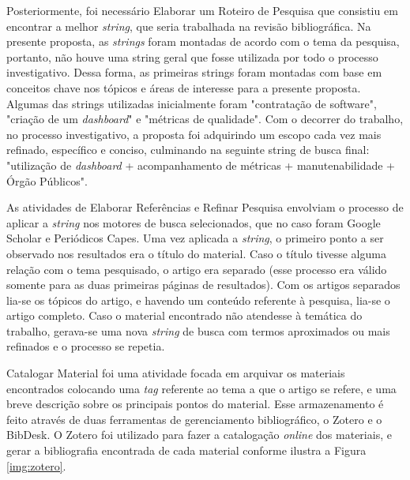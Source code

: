 Posteriormente, foi necessário Elaborar um Roteiro de Pesquisa que consistiu em encontrar a melhor \textit{string}, que seria trabalhada na revisão bibliográfica. Na presente proposta, as \textit{strings} foram montadas de acordo com o tema da pesquisa, portanto, não houve uma string geral que fosse utilizada por todo o processo investigativo. Dessa forma, as primeiras strings foram montadas com base em conceitos chave nos tópicos e áreas de interesse para a presente proposta. Algumas das strings utilizadas inicialmente foram "contratação de software", "criação de um \textit{dashboard}" e "métricas de qualidade". Com o decorrer do trabalho, no processo investigativo, a proposta foi adquirindo um escopo cada vez mais refinado, específico e conciso, culminando na seguinte string de busca final: "utilização de \textit{dashboard} + acompanhamento de métricas + manutenabilidade + Órgão Públicos". 

As atividades de Elaborar Referências e Refinar Pesquisa envolviam o processo de aplicar a \textit{string} nos motores de busca selecionados, que no caso foram Google Scholar e Periódicos Capes. Uma vez aplicada a \textit{string}, o primeiro ponto a ser observado nos resultados era o título do material. Caso o título tivesse alguma relação com o tema pesquisado, o artigo era separado (esse processo era válido somente para as duas primeiras páginas de resultados). Com os artigos separados lia-se os tópicos do artigo, e havendo um conteúdo referente à pesquisa, lia-se o artigo completo. Caso o  material encontrado não atendesse à temática do trabalho, gerava-se uma nova \textit{string} de busca com termos aproximados ou mais refinados e o processo se repetia.

Catalogar Material foi uma atividade focada em arquivar os materiais encontrados colocando uma \textit{tag} referente ao tema a que o artigo se refere, e uma breve descrição sobre os principais pontos do material. Esse armazenamento é feito através de duas ferramentas de gerenciamento bibliográfico, o Zotero e o BibDesk. O Zotero foi utilizado para fazer a catalogação \textit{online} dos materiais, e gerar a bibliografia encontrada de cada material conforme ilustra a Figura \ref{img:zotero}.

